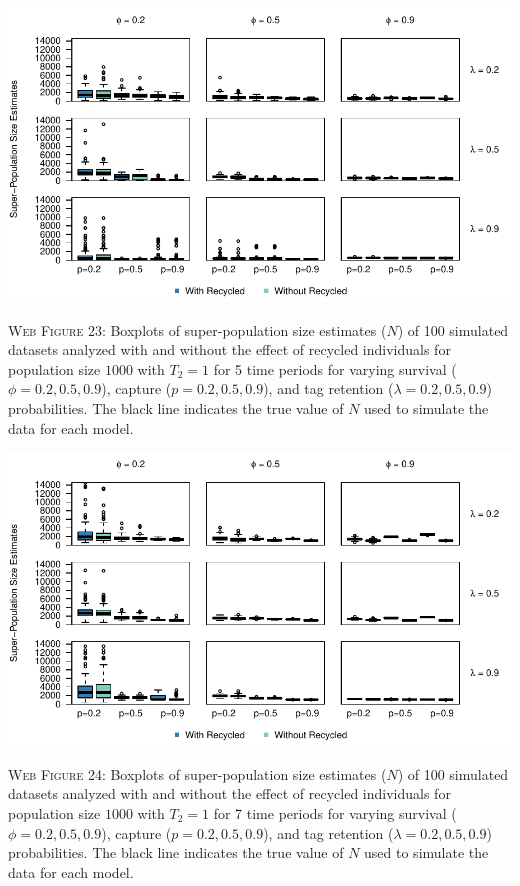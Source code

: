 \documentclass[]{article}
\begin{document}
\newpage

\includegraphics{Appendix_files/figure-latex/23_superN_GJSTL5-1.pdf}

\textsc{Web Figure 23:} Boxplots of super-population size estimates
(\(N\)) of 100 simulated datasets analyzed with and without the effect
of recycled individuals for population size \(1000\) with \(T_2=1\) for
5 time periods for varying survival (\(\phi=0.2,0.5,0.9\)), capture
(\(p=0.2,0.5,0.9\)), and tag retention (\(\lambda=0.2,0.5,0.9\))
probabilities. The black line indicates the true value of \(N\) used to
simulate the data for each model.

\includegraphics{Appendix_files/figure-latex/24_superN_GJSTL6-1.pdf}

\textsc{Web Figure 24:} Boxplots of super-population size estimates
(\(N\)) of 100 simulated datasets analyzed with and without the effect
of recycled individuals for population size \(1000\) with \(T_2=1\) for
7 time periods for varying survival (\(\phi=0.2,0.5,0.9\)), capture
(\(p=0.2,0.5,0.9\)), and tag retention (\(\lambda=0.2,0.5,0.9\))
probabilities. The black line indicates the true value of \(N\) used to
simulate the data for each model.
\end{document}
